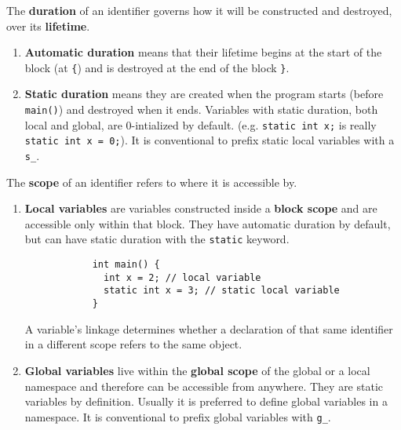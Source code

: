 \documentclass{article}
\begin{document}
      \begin{definition}[Duration]
        The \textbf{duration} of an identifier governs how it will be constructed and destroyed, over its \textbf{lifetime}. 
        \begin{enumerate}
          \item \textbf{Automatic duration} means that their lifetime begins at the start of the block (at \texttt{\{}) and is destroyed at the end of the block \texttt{\}}. 
          \item \textbf{Static duration} means they are created when the program starts (before \texttt{main()}) and destroyed when it ends. Variables with static duration, both local and global, are 0-intialized by default. (e.g. \texttt{static int x;} is really \texttt{static int x = 0;}). It is conventional to prefix static local variables with a \texttt{s\_}. 
        \end{enumerate}
      \end{definition} 

      \begin{definition}[Scope]
        The \textbf{scope} of an identifier refers to where it is accessible by. 
        \begin{enumerate}
          \item \textbf{Local variables} are variables constructed inside a \textbf{block scope} and are accessible only within that block. They have automatic duration by default, but can have static duration with the \texttt{static} keyword. 

          \begin{lstlisting}
            int main() {
              int x = 2; // local variable 
              static int x = 3; // static local variable
            }
          \end{lstlisting}
          A variable's linkage determines whether a declaration of that same identifier in a different scope refers to the same object. 

          \item \textbf{Global variables} live within the \textbf{global scope} of the global or a local namespace and therefore can be accessible from anywhere. They are static variables by definition. Usually it is preferred to define global variables in a namespace. It is conventional to prefix global variables with \texttt{g\_}. 
        \end{enumerate}
      \end{definition} 
\end{document}
